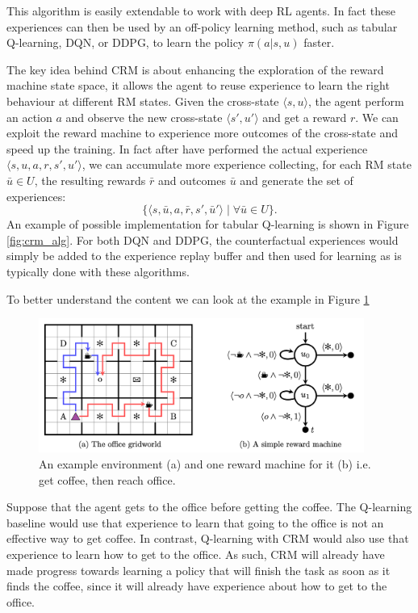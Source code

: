 \documentclass{article}
\begin{document}
This algorithm is easily extendable to work with deep RL agents. In fact these experiences can then be used by an off-policy learning method, such as tabular Q-learning, DQN, or DDPG, to learn the policy $\pi(a|s,u)$ faster.

The key idea behind CRM is about enhancing the exploration of the reward machine state space, it allows the agent to reuse experience to learn the right behaviour at different RM states. Given the cross-state $\langle s,u\rangle$, the agent perform an action $a$ and observe the new cross-state $\langle s',u'\rangle$ and get a reward $r$. We can exploit the reward machine to experience more outcomes of the cross-state and speed up the training. In fact after have performed the actual experience $\langle s,u,a,r,s',u'\rangle$, we can accumulate more experience collecting, for each RM state $\bar{u}\in U$, the resulting rewards $\bar{r}$ and outcomes $\bar{u}$ and generate the set of experiences:
\begin{equation} \label{eq:crm}
   \big\{ \langle s,\bar{u},a,\bar{r},s',\bar{u}'\rangle\; | \;\forall \bar{u}\in U \big\}.
\end{equation}
An example of possible implementation for tabular Q-learning is shown in Figure \ref{fig:crm_alg}. For both DQN and DDPG, the counterfactual experiences would simply be added to the experience replay buffer and then used for learning as is typically done with these algorithms.

To better understand the content we can look at the example in Figure \ref{fig:examp_crm} 

\begin{figure}[h]
    \centering
    \includegraphics[width=0.95\textwidth]{images/examp_CRM.png}
    \caption{An example environment (a) and one reward machine for it (b) i.e. get coffee, then reach office.}
    \label{fig:examp_crm}
\end{figure}

Suppose that the agent gets to the office before getting the coffee. The Q-learning baseline would use that experience to learn that going to the office is not an effective way to get coffee. In contrast, Q-learning with CRM would also use that experience to learn how to get to the office. As such, CRM will already have made progress towards learning a policy that will finish the task as soon as it finds the coffee, since it will already have experience about how to get to the office.
\end{document}
